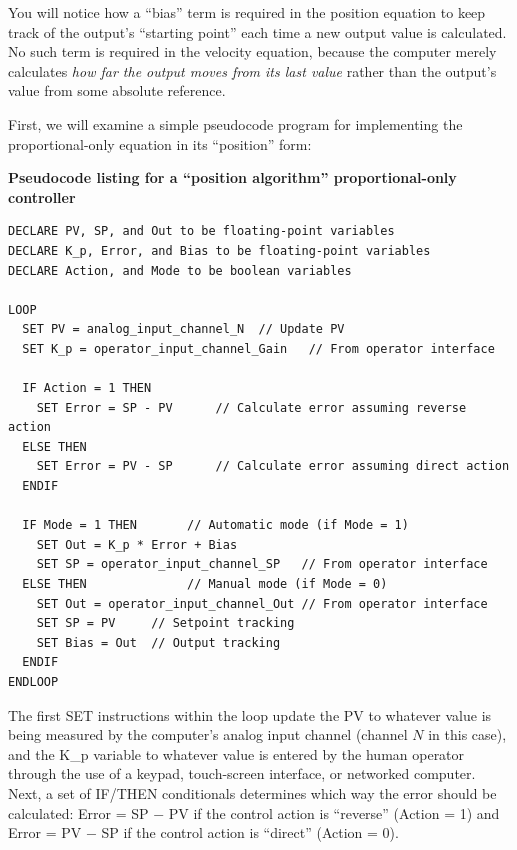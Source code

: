 You will notice how a ``bias'' term is required in the position equation to keep track of the output's ``starting point'' each time a new output value is calculated.  No such term is required in the velocity equation, because the computer merely calculates \textit{how far the output moves from its last value} rather than the output's value from some absolute reference.

\vskip 10pt

\filbreak

First, we will examine a simple pseudocode program for implementing the proportional-only equation in its ``position'' form:

\vskip 10pt

\textbf{Pseudocode listing for a ``position algorithm'' proportional-only controller}

\lstset{language=pseudocode}
\begin{lstlisting}
DECLARE PV, SP, and Out to be floating-point variables
DECLARE K_p, Error, and Bias to be floating-point variables
DECLARE Action, and Mode to be boolean variables

LOOP
  SET PV = analog_input_channel_N  // Update PV 
  SET K_p = operator_input_channel_Gain   // From operator interface

  IF Action = 1 THEN
    SET Error = SP - PV      // Calculate error assuming reverse action
  ELSE THEN
    SET Error = PV - SP      // Calculate error assuming direct action
  ENDIF

  IF Mode = 1 THEN       // Automatic mode (if Mode = 1)
    SET Out = K_p * Error + Bias
    SET SP = operator_input_channel_SP   // From operator interface
  ELSE THEN              // Manual mode (if Mode = 0)
    SET Out = operator_input_channel_Out // From operator interface 
    SET SP = PV     // Setpoint tracking
    SET Bias = Out  // Output tracking
  ENDIF
ENDLOOP
\end{lstlisting}

\vskip 10pt

The first SET instructions within the loop update the PV to whatever value is being measured by the computer's analog input channel (channel $N$ in this case), and the K\_p variable to whatever value is entered by the human operator through the use of a keypad, touch-screen interface, or networked computer.  Next, a set of IF/THEN conditionals determines which way the error should be calculated: Error = SP $-$ PV if the control action is ``reverse'' (Action = 1) and Error = PV $-$ SP if the control action is ``direct'' (Action = 0).

